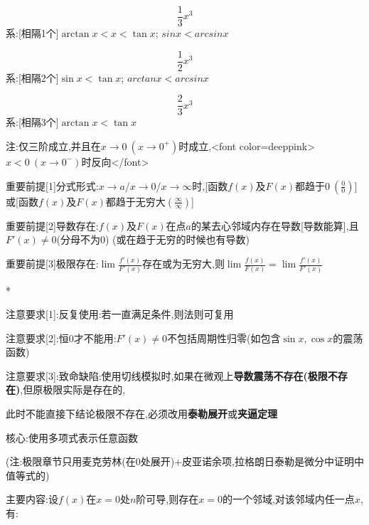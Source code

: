 \documentclass[11pt,a4paper,UTF8]{ctexart}
\begin{document}
\begin{thmbox}[{解法[3]: [代数]等价无穷小比阶}]
  
\begin{equation*}
\frac{1}{3}x^3
\end{equation*}
系:[相隔1个]$\arctan x < x  < \tan x$;	$sinx<arcsinx$

  
\begin{equation*}
\frac{1}{2}x^3
\end{equation*}
系:[相隔2个]$\sin x < \tan x$;	  $arctanx<arcsinx$

  
\begin{equation*}
\frac{2}{3}x^3
\end{equation*}
系:[相隔3个]$\arctan x <\tan x$

  注:仅三阶成立,并且在$x \to 0\ (x \to 0^+)$时成立,<font color=deeppink>$x < 0\ (x \to 0^-)$时反向</font>

\end{thmbox}
\begin{thmbox}[{解法[4]: [微分]洛必达法则}]

重要前提[1]分式形式:$x \to a$/$x \to 0$/$x \to \infty$时,[函数$f(x)$及$F(x)$都趋于$0\ (\frac{0}{0})$]或[函数$f(x)$及$F(x)$都趋于无穷大$(\frac{\infty}{\infty})$]

重要前提[2]导数存在:$f(x)$及$F(x)$在点$a$的某去心邻域内存在导数[导数能算],且$F'(x) \neq 0$(分母不为$0$) (或在趋于无穷的时候也有导数)

重要前提[3]极限存在:$\lim \frac{f'(x)}{F'(x)}$存在或为无穷大,则$\lim \frac{f(x)}{F(x)} = \lim \frac{f'(x)}{F'(x)}$

\textit{}*

注意要求[1]:反复使用:若一直满足条件,则法则可复用

注意要求[2]:恒0才不能用:$F'(x) \neq 0$不包括周期性归零(如包含$\sin x, \cos x$的震荡函数)

注意要求[3]:致命缺陷:使用切线模拟时,如果在微观上\textbf{导数震荡不存在(极限不存在)},但原极限实际是存在的,

  此时不能直接下结论极限不存在,必须改用\textbf{泰勒展开}或\textbf{夹逼定理}

\end{thmbox}
\begin{thmbox}[{解法[5]: [微分]泰勒公式}]

核心:使用多项式表示任意函数

  (注:极限章节只用麦克劳林(在0处展开)+皮亚诺余项,拉格朗日泰勒是微分中证明中值等式的)

主要内容:设$f(x)$在$x=0$处$n$阶可导,则存在$x=0$的一个邻域,对该邻域内任一点$x$,有:

\end{thmbox}
\end{document}
